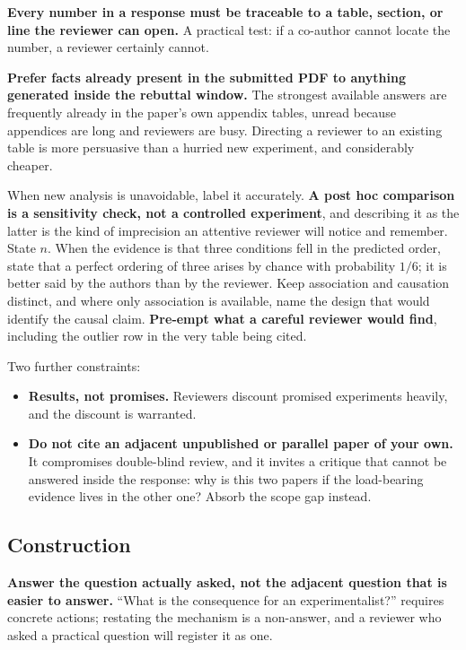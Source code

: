 \textbf{Every number in a response must be traceable to a table, section, or line the reviewer can open.}
A practical test: if a co-author cannot locate the number, a reviewer certainly cannot.

\textbf{Prefer facts already present in the submitted PDF to anything generated inside the rebuttal window.}
The strongest available answers are frequently already in the paper's own appendix tables, unread because appendices are long and reviewers are busy.
Directing a reviewer to an existing table is more persuasive than a hurried new experiment, and considerably cheaper.

When new analysis is unavoidable, label it accurately.
\textbf{A post hoc comparison is a sensitivity check, not a controlled experiment}, and describing it as the latter is the kind of imprecision an attentive reviewer will notice and remember.
State $n$.
When the evidence is that three conditions fell in the predicted order, state that a perfect ordering of three arises by chance with probability $1/6$; it is better said by the authors than by the reviewer.
Keep association and causation distinct, and where only association is available, name the design that would identify the causal claim.
\textbf{Pre-empt what a careful reviewer would find}, including the outlier row in the very table being cited.

Two further constraints:
\begin{itemize}
    \item \textbf{Results, not promises.}
    Reviewers discount promised experiments heavily, and the discount is warranted.
    \item \textbf{Do not cite an adjacent unpublished or parallel paper of your own.}
    It compromises double-blind review, and it invites a critique that cannot be answered inside the response: why is this two papers if the load-bearing evidence lives in the other one?
    Absorb the scope gap instead.
\end{itemize}

\subsection*{Construction}

\textbf{Answer the question actually asked, not the adjacent question that is easier to answer.}
``What is the consequence for an experimentalist?'' requires concrete actions; restating the mechanism is a non-answer, and a reviewer who asked a practical question will register it as one.

